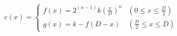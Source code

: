 \documentclass[
  11pt,
  border=2,
  convert={
    density=100 -alpha remove,
    outext=.png
  },
]{standalone}
\begin{document}
$
  e(x) = \begin{cases}
    \displaystyle f(x) = 2^{(n-1)}k\left(\frac{x}{D}\right)^{n}
      & \left(0 \leq x \leq \frac{D}{2}\right)
    \\
    \displaystyle g(x) = k - f(D-x)
      & \left(\frac{D}{2} \leq x \leq D\right)
  \end{cases}
$
\end{document}
